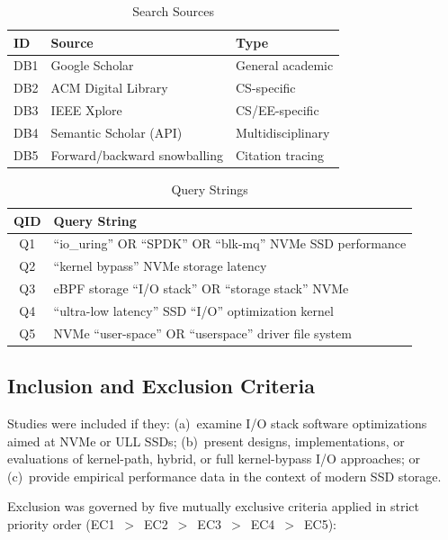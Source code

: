 \documentclass[conference]{IEEEtran}
\begin{document}
\begin{table}[t]
\caption{Search Sources}
\label{tab:sources}
\centering
\small
\begin{tabular}{@{}lll@{}}
\toprule
ID & Source & Type \\
\midrule
DB1 & Google Scholar & General academic \\
DB2 & ACM Digital Library & CS-specific \\
DB3 & IEEE Xplore & CS/EE-specific \\
DB4 & Semantic Scholar (API) & Multidisciplinary \\
DB5 & Forward/backward snowballing & Citation tracing \\
\bottomrule
\end{tabular}
\end{table}

\begin{table}[t]
\caption{Query Strings}
\label{tab:queries}
\centering
\small
\begin{tabular}{@{}cp{5.5cm}@{}}
\toprule
QID & Query String \\
\midrule
Q1 & ``io\_uring'' OR ``SPDK'' OR ``blk-mq'' NVMe SSD performance \\
Q2 & ``kernel bypass'' NVMe storage latency \\
Q3 & eBPF storage ``I/O stack'' OR ``storage stack'' NVMe \\
Q4 & ``ultra-low latency'' SSD ``I/O'' optimization kernel \\
Q5 & NVMe ``user-space'' OR ``userspace'' driver file system \\
\bottomrule
\end{tabular}
\end{table}

\subsection{Inclusion and Exclusion Criteria}

Studies were included if they: (a)~examine I/O stack software optimizations aimed at NVMe or ULL SSDs; (b)~present designs, implementations, or evaluations of kernel-path, hybrid, or full kernel-bypass I/O approaches; or (c)~provide empirical performance data in the context of modern SSD storage.

Exclusion was governed by five mutually exclusive criteria applied in strict priority order (EC1~$>$~EC2~$>$~EC3~$>$~EC4~$>$~EC5):
\end{document}
